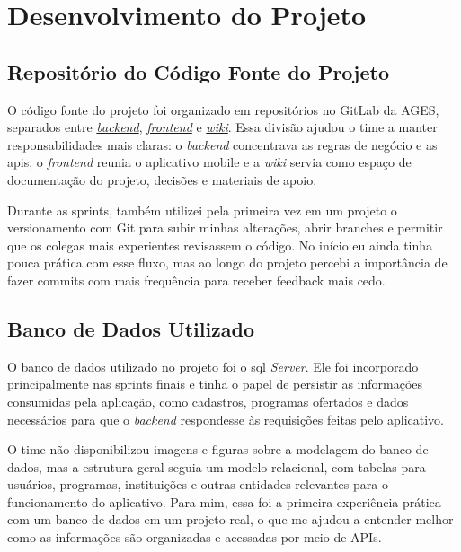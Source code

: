 \section[Desenvolvimento do Projeto]{Desenvolvimento do Projeto}

\subsection{Repositório do Código Fonte do Projeto}
O código fonte do projeto foi organizado em repositórios no GitLab da AGES, separados entre \href{https://tools.ages.pucrs.br/informativo-para-imigrantes/informativo-para-imigrantes-backend}{\textit{backend}}, \href{https://tools.ages.pucrs.br/informativo-para-imigrantes/informativo-para-imigrantes-frontend}{\textit{frontend}} e \href{https://tools.ages.pucrs.br/informativo-para-imigrantes/wiki}{\textit{wiki}}. Essa divisão ajudou o time a manter responsabilidades mais claras: o \textit{backend} concentrava as regras de negócio e as \ac{api}s, o \textit{frontend} reunia o aplicativo mobile e a \textit{wiki} servia como espaço de documentação do projeto, decisões e materiais de apoio.

Durante as sprints, também utilizei pela primeira vez em um projeto o versionamento com Git \cite{git} para subir minhas alterações, abrir branches e permitir que os colegas mais experientes revisassem o código. No início eu ainda tinha pouca prática com esse fluxo, mas ao longo do projeto percebi a importância de fazer commits com mais frequência para receber feedback mais cedo.



\subsection{Banco de Dados Utilizado}
O banco de dados utilizado no projeto foi o \ac{sql} \textit{Server}. Ele foi incorporado principalmente nas sprints finais e tinha o papel de persistir as informações consumidas pela aplicação, como cadastros, programas ofertados e dados necessários para que o \textit{backend} respondesse às requisições feitas pelo aplicativo.

O time não disponibilizou imagens e figuras sobre a modelagem do banco de dados, mas a estrutura geral seguia um modelo relacional, com tabelas para usuários, programas, instituições e outras entidades relevantes para o funcionamento do aplicativo. Para mim, essa foi a primeira experiência prática com um banco de dados em um projeto real, o que me ajudou a entender melhor como as informações são organizadas e acessadas por meio de APIs.

